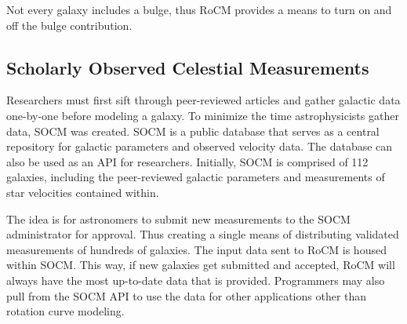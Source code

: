 \documentclass[conference]{IEEEtran}
\begin{document}
Not every galaxy includes a bulge, thus RoCM provides a means to turn on and off the bulge contribution.

\subsection{Scholarly Observed Celestial Measurements}
Researchers must first sift through peer-reviewed articles and gather galactic data one-by-one before modeling a galaxy. To minimize the time astrophysicists gather data, SOCM was created. SOCM is a public database that serves as a central repository for galactic parameters and observed velocity data. The database can also be used as an API for researchers. Initially, SOCM is comprised of 112 galaxies, including the peer-reviewed galactic parameters and measurements of star velocities contained within. 
       
The idea is for astronomers to submit new measurements to the SOCM administrator for approval. Thus creating a single means of distributing validated measurements of hundreds of galaxies. The input data sent to RoCM is housed within SOCM. This way, if new galaxies get submitted and accepted, RoCM will always have the most up-to-date data that is provided. Programmers may also pull from the SOCM API to use the data for other applications other than rotation curve modeling.
\end{document}
